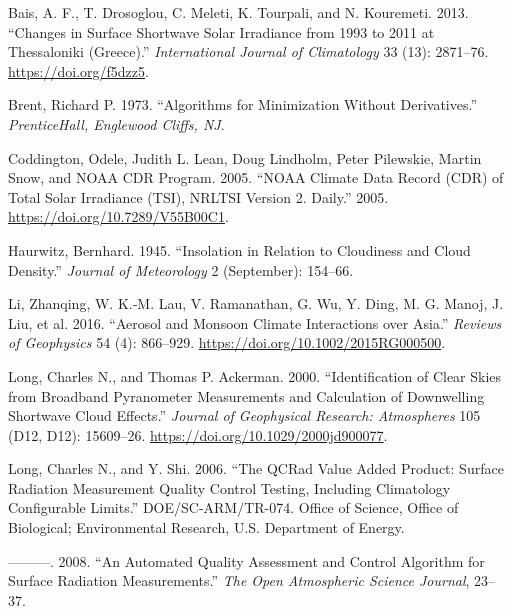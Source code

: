 \documentclass[
]{article}
\newlength{\cslhangindent}
\newlength{\cslentryspacingunit} %
\newenvironment{CSLReferences}[2] %
 {%
  \setlength{\parindent}{0pt}
  \ifodd #1
  \let\oldpar\par
  \def\par{\hangindent=\cslhangindent\oldpar}
  \fi
  \setlength{\parskip}{#2\cslentryspacingunit}
 }%
 {}
\begin{document}
\hypertarget{refs}{}
\begin{CSLReferences}{1}{0}
\leavevmode{}%
Bais, A. F., T. Drosoglou, C. Meleti, K. Tourpali, and N. Kouremeti. 2013. {``Changes in Surface Shortwave Solar Irradiance from 1993 to 2011 at Thessaloniki (Greece).''} \emph{International Journal of Climatology} 33 (13): 2871--76. \url{https://doi.org/f5dzz5}.

\leavevmode{}%
Brent, Richard P. 1973. {``Algorithms for Minimization Without Derivatives.''} \emph{PrenticeHall, Englewood Cliffs, NJ}.

\leavevmode{}%
Coddington, Odele, Judith L. Lean, Doug Lindholm, Peter Pilewskie, Martin Snow, and NOAA CDR Program. 2005. {``{NOAA} Climate Data Record ({CDR}) of Total Solar Irradiance ({TSI}), {NRLTSI} Version 2. {D}aily.''} 2005. \url{https://doi.org/10.7289/V55B00C1}.

\leavevmode{}%
Haurwitz, Bernhard. 1945. {``Insolation in {Relation} to {Cloudiness} and {Cloud} {Density}.''} \emph{Journal of Meteorology} 2 (September): 154--66.

\leavevmode{}%
Li, Zhanqing, W. K.‐M. Lau, V. Ramanathan, G. Wu, Y. Ding, M. G. Manoj, J. Liu, et al. 2016. {``Aerosol and Monsoon Climate Interactions over Asia.''} \emph{Reviews of Geophysics} 54 (4): 866--929. \url{https://doi.org/10.1002/2015RG000500}.

\leavevmode{}%
Long, Charles N., and Thomas P. Ackerman. 2000. {``Identification of Clear Skies from Broadband Pyranometer Measurements and Calculation of Downwelling Shortwave Cloud Effects.''} \emph{Journal of Geophysical Research: Atmospheres} 105 (D12, D12): 15609--26. \url{https://doi.org/10.1029/2000jd900077}.

\leavevmode{}%
Long, Charles N., and Y. Shi. 2006. {``The QCRad Value Added Product: Surface Radiation Measurement Quality Control Testing, Including Climatology Configurable Limits.''} DOE/SC-ARM/TR-074. Office of Science, Office of Biological; Environmental Research, U.S. Department of Energy.

\leavevmode{}%
---------. 2008. {``An Automated Quality Assessment and Control Algorithm for Surface Radiation Measurements.''} \emph{The Open Atmospheric Science Journal}, 23--37.


\end{CSLReferences}
\end{document}
